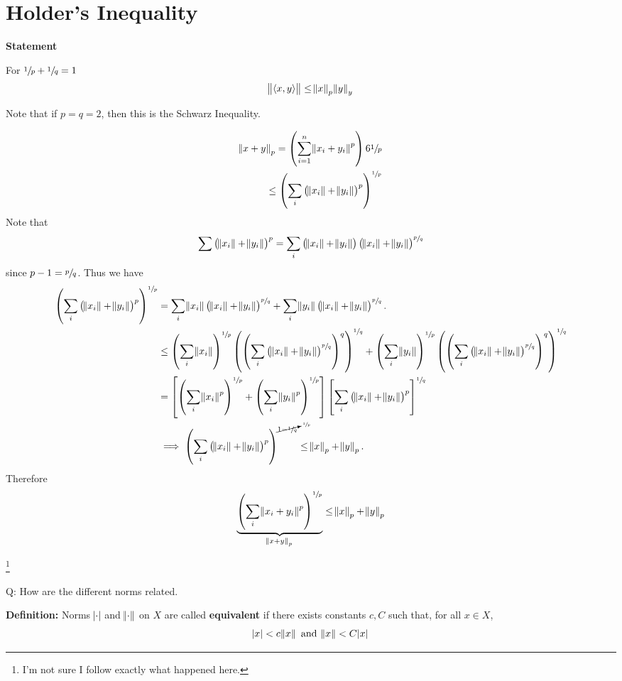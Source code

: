 \documentclass{article}
\DeclarePairedDelimiter\ip{\langle }{\rangle}
\begin{document}
\section{Holder's Inequality}

\textbf{Statement}

For \(\sfrac{1}{p} + \sfrac{1}{q} = 1\)
\[\norm{\ip{x, y}} \leq \norm{x}_p\norm{y}_y\]

Note that if \(p = q = 2\), then this is the Schwarz Inequality.

\begin{align*}
  \norm{x+y}_p = \del{\sum_{i=1}^n \norm{x_i + y_i}^p}6{\sfrac{1}{p}}\\
  \leq \del{\sum_i\del{\norm{x_i} + \norm{y_i}}^p}^{\sfrac{1}{p}}\\
\end{align*}
Note that
\[\sum\del{\norm{x_i} + \norm{y_i}}^p = \sum_i \del{\norm{x_i} + \norm{y_i}}\del{\norm{x_i} +\norm{y_i}}^{\sfrac{p}{q}}\]
since \(p - 1 = \sfrac{p}{q}\).
Thus we have
\begin{align*}
  \del{\sum_i\del{\norm{x_i} + \norm{y_i}}^p}^{\sfrac{1}{p}}
  &=  \sum_i \norm{x_i}\del{\norm{x_i} + \norm{y_i}}^{\sfrac{p}{q}} + \sum_i\norm{y_i}\del{\norm{x_i} + \norm{y_i}}^{\sfrac{p}{q}}.\\
  &\leq \del{\sum_i \norm{x_i}}^{\sfrac{1}{p}} \del{\del{\sum_i\del{\norm{x_i} + \norm{y_i}}^{\sfrac{p}{q}}}^q}^{\sfrac{1}{q}} + \del{\sum_i \norm{y_i}}^{\sfrac{1}{p}} \del{\del{\sum_i\del{\norm{x_i} + \norm{y_i}}^{\sfrac{p}{q}}}^q}^{\sfrac{1}{q}}\\
  &= \sbr{\del{\sum_i \norm{x_i}^p}^{\sfrac{1}{p}} + \del{\sum_i \norm{y_i}^p}^{\sfrac{1}{p}}}\sbr{\sum_i \del{\norm{x_i} + \norm{y_i}}^p}^{\sfrac{1}{q}}\\
  &\implies  \del{\sum_i \del{\norm{x_i} + \norm{y_i}}^p}^{\cancelto{\sfrac{1}{p}}{1 - \sfrac{1}{q}}} \leq \norm{x}_p + \norm{y}_p.
\end{align*}
Therefore
\[\underbrace{\del{\sum_i\norm{x_i + y_i}^p}^{\sfrac{1}{p}}}_{\norm{x + y}_p} \leq \norm{x}_p + \norm{y}_p\]

\footnote{I'm not sure I follow exactly what happened here.}

Q: How are the different norms related.

\textbf{Definition:} Norms \(\abs{\cdot}\) and \(\norm{\cdot}\) on \(X\) are called \textbf{equivalent} if there exists constants \(c, C\) such that, for all \(x \in X\),
\[\abs{x} < c\norm{x}\text{ and }\norm{x} < C\abs{x}\]
\end{document}

